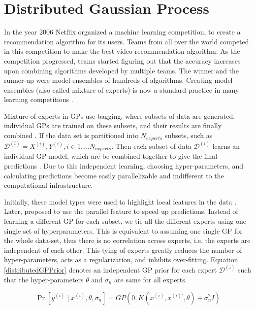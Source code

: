 \section{Distributed Gaussian Process}\label{secDgp}
In the year 2006 Netflix organized a machine learning competition, to create a recommendation algorithm for its users. Teams from all over the world competed in this competition to make the best video recommendation algorithm. As the competition progressed, teams started figuring out that the accuracy increases upon combining algorithms developed by multiple teams. The winner and the runner-up were model ensembles of hundreds of algorithms. Creating model ensembles (also called mixture of experts) is now a standard practice in many learning competitions \cite{bauer1998empirical}. 

Mixture of experts in GPs use bagging, where subsets of data are generated, individual GPs are trained on these subsets, and their results are finally combined \cite{chen2009bagging}. If the data set is partitioned  into $N_{experts}$ subsets, such as $\mathcal{D}^{(i)} = {X^{(i)}, Y^{(i)}}, i \in 1, \ldots N_{experts}$. Then each subset of data $\mathcal{D}^{(i)}$ learns an individual GP model, which are be combined together to give the final predictions . Due to this independent learning, choosing hyper-parameters, and calculating predictions become easily parallelizable and indifferent to the computational infrastructure. 

\sloppy Initially, these model types were used to highlight local features in the data \cite{rasmussen2002infinite}. Later,  \cite{ng2014hierarchical} proposed to use the parallel feature to speed up predictions. Instead of learning a different GP for each subset, we tie all the different experts using one single set of hyperparameters. This is equivalent to assuming one single GP for the whole data-set, thus there is no correlation across experts, i.e. the experts are independent of each other. This tying of experts greatly reduces the number of hyper-parameters, acts as a regularization, and inhibits over-fitting. Equation \ref{distributedGPPrior} denotes an independent GP prior for each expert $\mathcal{D}^{(i)}$ such that the hyper-parameters $\theta$ and $\sigma_{n}$ are same for all experts.

\begin{equation}\label{distributedGPPrior}
    \Pr[y^{(i)} \mid x^{(i)}, \theta, \sigma_{n}] = GP(0, K(x^{(i)}, x^{(i)'}, \theta) + \sigma^{2}_{n}I) 
\end{equation}

